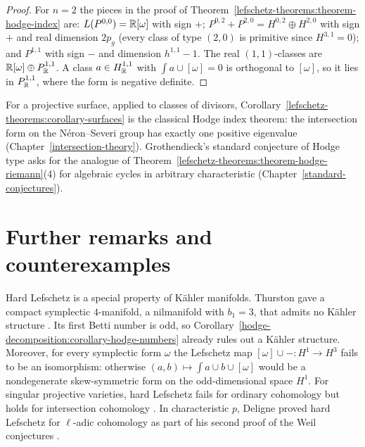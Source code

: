 \begin{proof}
For $n = 2$ the pieces in the proof of Theorem~\ref{lefschetz-theorems:theorem-hodge-index} are: $L(P^{0,0}) = \mathbb{R}[\omega]$ with sign $+$;
$P^{0,2} + P^{2,0} = H^{0,2} \oplus H^{2,0}$ with sign $+$ and real dimension $2p_g$ (every class of type $(2,0)$ is primitive since
$H^{3,1} = 0$); and $P^{1,1}$ with sign $-$ and dimension $h^{1,1} - 1$. The real $(1,1)$-classes are $\mathbb{R}[\omega] \oplus P^{1,1}_{\mathbb{R}}$. A class
$a \in H^{1,1}_{\mathbb{R}}$ with $\int a \cup [\omega] = 0$ is orthogonal to $[\omega]$, so it lies in $P^{1,1}_{\mathbb{R}}$, where the form is negative
definite.
\end{proof}

\begin{remark}\label{lefschetz-theorems:remark-hodge-index-divisors}
For a projective surface, applied to classes of divisors, Corollary~\ref{lefschetz-theorems:corollary-surfaces} is the classical Hodge
index theorem: the intersection form on the N\'eron--Severi group has exactly one positive eigenvalue (Chapter~\ref{intersection-theory}).
Grothendieck's standard conjecture of Hodge type asks for the analogue of Theorem~\ref{lefschetz-theorems:theorem-hodge-riemann}(4) for
algebraic cycles in arbitrary characteristic (Chapter~\ref{standard-conjectures}).
\end{remark}

\section{Further remarks and counterexamples}\label{lefschetz-theorems:section-remarks}

\begin{remark}\label{lefschetz-theorems:remark-symplectic}
Hard Lefschetz is a special property of K\"ahler manifolds. Thurston gave a compact symplectic $4$-manifold, a nilmanifold with
$b_1 = 3$, that admits no K\"ahler structure \cite{thurston-1976}. Its first Betti number is odd, so
Corollary~\ref{hodge-decomposition:corollary-hodge-numbers} already rules out a K\"ahler structure. Moreover, for every symplectic form
$\omega$ the Lefschetz map $[\omega] \cup - \colon H^1 \to H^3$ fails to be an isomorphism: otherwise $(a, b) \mapsto \int a \cup b \cup [\omega]$
would be a nondegenerate skew-symmetric form on the odd-dimensional space $H^1$. For singular projective varieties, hard Lefschetz
fails for ordinary cohomology but holds for intersection cohomology \cite{bbd}. In characteristic $p$, Deligne proved hard Lefschetz for
$\ell$-adic cohomology as part of his second proof of the Weil conjectures \cite{deligne-weil-2}.
\end{remark}

